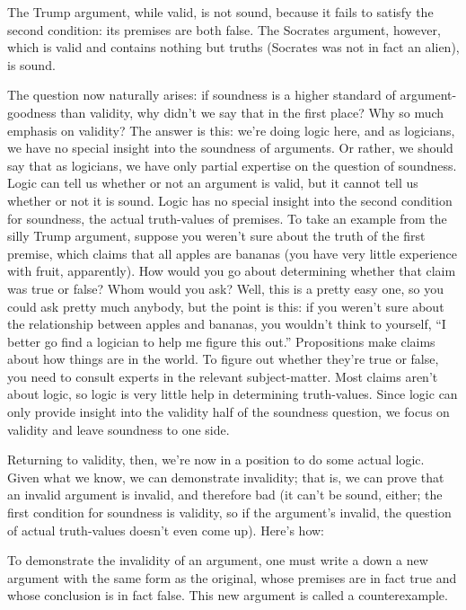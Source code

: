 The Trump argument, while valid, is not sound, because it fails to satisfy the second condition: its
premises are both false. The Socrates argument, however, which is valid and contains nothing but
truths (Socrates was not in fact an alien), is sound.

The question now naturally arises: if soundness is a higher standard of argument-goodness than
validity, why didn't we say that in the first place? Why so much emphasis on validity? The answer
is this: we're doing logic here, and as logicians, we have no special insight into the soundness of
arguments. Or rather, we should say that as logicians, we have only partial expertise on the
question of soundness. Logic can tell us whether or not an argument is valid, but it cannot tell us
whether or not it is sound. Logic has no special insight into the second condition for soundness,
the actual truth-values of premises. To take an example from the silly Trump argument, suppose
you weren't sure about the truth of the first premise, which claims that all apples are bananas (you
have very little experience with fruit, apparently). How would you go about determining whether
that claim was true or false? Whom would you ask? Well, this is a pretty easy one, so you could
ask pretty much anybody, but the point is this: if you weren't sure about the relationship between
apples and bananas, you wouldn't think to yourself, ``I better go find a logician to help me figure
this out.'' Propositions make claims about how things are in the world. To figure out whether
they're true or false, you need to consult experts in the relevant subject-matter. Most claims aren't
about logic, so logic is very little help in determining truth-values. Since logic can only provide
insight into the validity half of the soundness question, we focus on validity and leave soundness
to one side.

Returning to validity, then, we're now in a position to do some actual logic. Given what we know,
we can demonstrate invalidity; that is, we can prove that an invalid argument is invalid, and
therefore bad (it can't be sound, either; the first condition for soundness is validity, so if the
argument's invalid, the question of actual truth-values doesn't even come up). Here's how:

To demonstrate the invalidity of an argument, one must write a down a new argument with
the same form as the original, whose premises are in fact true and whose conclusion is in
fact false. This new argument is called a counterexample.


